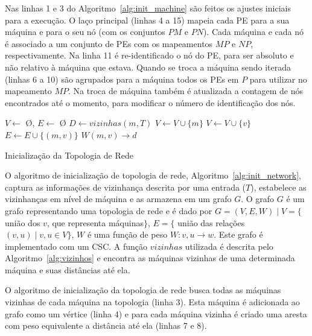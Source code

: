 Nas linhas 1 e 3 do Algoritmo~\ref{alg:init_machine} são feitos os ajustes iniciais para a execução. 
O laço principal (linhas 4 a 15) mapeia cada PE para a sua máquina e para o seu nó (com os conjuntos $PM$ e $PN$). 
Cada máquina e cada nó é associado a um conjunto de PEs com os mapeamentos $MP$ e $NP$, respectivamente.
Na linha 11 é re-identificado o nó do PE, para ser absoluto e não relativo à máquina que estava.
Quando se troca a máquina sendo iterada (linhas 6 a 10) são agrupados para a máquina todos os PEs em $P$ para utilizar no mapeamento $MP$.
Na troca de máquina também é atualizada a contagem de nós encontrados até o momento, para modificar o número de identificação dos nós.



\begin{algorithm}[t]
    \DontPrintSemicolon
    \BlankLine
    $V \leftarrow$ \O, \xspace
    $E \leftarrow$ \O\;
        {$D \leftarrow vizinhas(m, T)$\;
        $V \leftarrow V \cup \{m\}$\;
            {$V \leftarrow V \cup \{v\}$ \;
             $E \leftarrow E \cup \{(m, v)\}$\;
             $W(m, v) \rightarrow d$}
    }

\caption{Inicialização da Topologia de Rede}
\label{alg:init_network}
\end{algorithm}

O algoritmo de inicialização de topologia de rede, Algoritmo~\ref{alg:init_network}, captura as informações de vizinhança descrita por uma entrada ($T$), estabelece as vizinhanças em nível de máquina e as armazena em um grafo $G$.
O grafo $G$ é um grafo representando uma topologia de rede e é dado por $G = (V, E, W) \mid V = \{$ união dos $v$, que representa máquinas$\}$, $E = \{$ união das relações $(v, u) \mid v, u \in V\}$, $W$ é uma função de peso $W:v,u \rightarrow w$.
Este grafo é implementado com um CSC.
A função $vizinhas$ utilizada é descrita pelo Algoritmo~\ref{alg:vizinhos} e encontra as máquinas vizinhas de uma determinada máquina e suas distâncias até ela.

O algoritmo de inicialização da topologia de rede busca todas as máquinas vizinhas de cada máquina na topologia (linha 3).
Esta máquina é adicionada ao grafo como um vértice (linha 4) e para cada máquina vizinha é criado uma aresta com peso equivalente a distância até ela (linhas 7 e 8).

